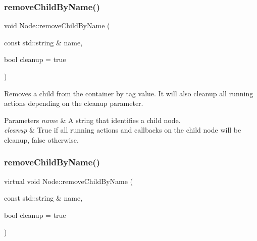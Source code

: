 \mbox{\label{classNode_a91086b878367386bd070789f2ea7c8a8}} 
\subsubsection{\texorpdfstring{remove\+Child\+By\+Name()}{removeChildByName()}\hspace{0.1cm}{\footnotesize\ttfamily [1/2]}}
{\footnotesize\ttfamily void Node\+::remove\+Child\+By\+Name (\begin{DoxyParamCaption}\item[{const std\+::string \&}]{name,  }\item[{bool}]{cleanup = {\ttfamily true} }\end{DoxyParamCaption})\hspace{0.3cm}{\ttfamily [virtual]}}

Removes a child from the container by tag value. It will also cleanup all running actions depending on the cleanup parameter.


\begin{DoxyParams}{Parameters}
{\em name} & A string that identifies a child node. \\
\hline
{\em cleanup} & True if all running actions and callbacks on the child node will be cleanup, false otherwise. \\
\hline
\end{DoxyParams}
\mbox{\label{classNode_a70e99fad1cb0a446e9d2bfeefd8b115f}} 
\subsubsection{\texorpdfstring{remove\+Child\+By\+Name()}{removeChildByName()}\hspace{0.1cm}{\footnotesize\ttfamily [2/2]}}
{\footnotesize\ttfamily virtual void Node\+::remove\+Child\+By\+Name (\begin{DoxyParamCaption}\item[{const std\+::string \&}]{name,  }\item[{bool}]{cleanup = {\ttfamily true} }\end{DoxyParamCaption})\hspace{0.3cm}{\ttfamily [virtual]}}

